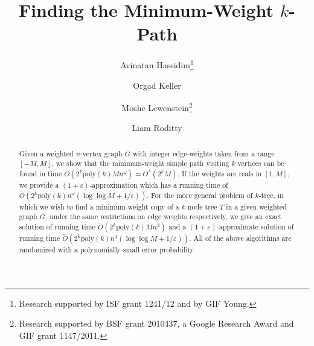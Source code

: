 \documentclass{llncs}
\newcommand{\poly}{\mathrm{poly}}
\begin{document}
\title{Finding the Minimum-Weight $k$-Path}



\author{Avinatan Hassidim\thanks{Research supported by ISF grant 1241/12 and by GIF Young.} \and Orgad Keller \and Moshe Lewenstein\thanks{Research supported by BSF grant 2010437, a Google Research Award and GIF grant 1147/2011.} \and Liam Roditty}



\maketitle

\begin{abstract}
Given a weighted $n$-vertex graph $G$ with integer edge-weights taken from a range $[-M,M]$, we show that the minimum-weight simple path visiting $k$ vertices can be found in time $\tilde{O}(2^k \poly(k) M n^\omega) = O^*(2^k M)$. If the weights are reals in $[1,M]$, we provide a $(1+\varepsilon)$-approximation which has a running time of $\tilde{O}(2^k \poly(k) n^\omega(\log\log M + 1/\varepsilon))$. For the more general problem of $k$-tree, in which we wish to find a minimum-weight copy of a $k$-node tree $T$ in a given weighted graph $G$, under the same restrictions on edge weights respectively, we give an exact solution of running time $\tilde{O}(2^k \poly(k) M n^3) $ and a $(1+\varepsilon)$-approximate solution of running time $\tilde{O}(2^k \poly(k) n^3(\log\log M + 1/\varepsilon))$. All of the above algorithms are randomized with a polynomially-small error probability.
\end{abstract}
\end{document}
